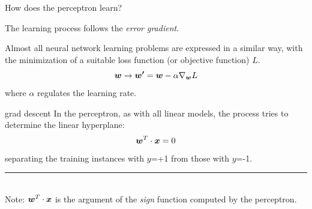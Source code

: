 \begin{frame}[t]{How does the perceptron learn?}

    The learning process follows the {\em error gradient}.\\
    \vspace{0.4cm}   

    Almost all neural network learning problems are expressed in a similar way, 
    with the minimization of a suitable 
    \gls{loss function} (or 
    \gls{objective function}) $L$.\\
    \begin{equation}
        \boldsymbol{w} \rightarrow \boldsymbol{w^\prime} = \boldsymbol{w} - \alpha \nabla_{\boldsymbol{w}} L
        \label{eq:weight_update_grad_descent}
    \end{equation}
    where $\alpha$ regulates the learning rate.\\
    \vspace{0.4cm}

    {\color{red}grad descent}
    In the \gls{perceptron},
    as with all \glspl{linear model},
    the process tries to determine the linear hyperplane: 
    \begin{equation}
        \boldsymbol{w}^T \cdot \boldsymbol{x} = 0
        \label{eq:percepton_hyperplane_1}
    \end{equation} 
    separating the training instances with $y$=+1 
    from those with $y$=-1.\\
    \vspace{0.2cm}
    \noindent\rule{4cm}{0.4pt}\\
    {\small
        Note: $\boldsymbol{w}^T \cdot \boldsymbol{x}$ 
        is the argument of the {\em sign} function computed by the 
        \gls{perceptron}.\\
    }

\end{frame}


%
%
%

